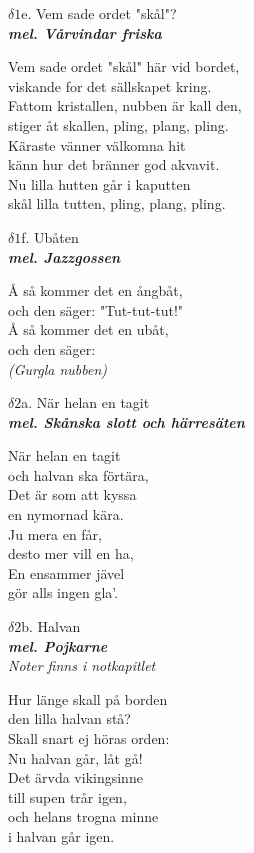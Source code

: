 \documentclass[a6paper,10pt]{article}
\newcommand{\mel}[1]{\small\textbf{\textit{mel. #1 \\}}}
\begin{document}
\newpage
\setlength{\oddsidemargin}{-0.37in}
\noindent
\begin{center}
\Large $\delta1$e. Vem sade ordet "skål"? \\ 
\mel{Vårvindar friska}
\end{center}
Vem sade ordet "skål" här vid bordet,\\
viskande for det sällskapet kring.\\
Fattom kristallen, nubben är kall den,\\
stiger åt skallen, pling, plang, pling.\\
Käraste vänner välkomna hit\\
känn hur det bränner god akvavit.\\
Nu lilla hutten går i kaputten\\
skål lilla tutten, pling, plang, pling.
\vspace{60pt}
\begin{center}
\Large $\delta1$f. Ubåten \\ 
\mel{Jazzgossen}
\end{center}
Å så kommer det en ångbåt, \\
och den säger: "Tut-tut-tut!" \\
Å så kommer det en ubåt, \\
och den säger: \\
\textit{(Gurgla nubben) }

\setlength{\oddsidemargin}{-0.47in}
\noindent
\begin{center}
\Large $\delta2$a. När helan en tagit \\ 
\mel{Skånska slott och härresäten}
\end{center}
När helan en tagit \\
och halvan ska förtära, \\
Det är som att kyssa \\
en nymornad kära. 
\vspace{5pt} \\
Ju mera en får, \\
desto mer vill en ha, \\
En ensammer jävel \\
gör alls ingen gla'. 
\vspace{60pt}
\begin{center}
\Large $\delta2$b. Halvan \\ 
\mel{Pojkarne}
\textit{Noter finns i notkapitlet}
\end{center}
Hur länge skall på borden\\ 
den lilla halvan stå? \\
Skall snart ej höras orden: \\
Nu halvan går, låt gå!
\vspace{5pt} \\
Det ärvda vikingsinne \\
till supen trår igen, \\
och helans trogna minne \\
i halvan går igen.
\end{document}
